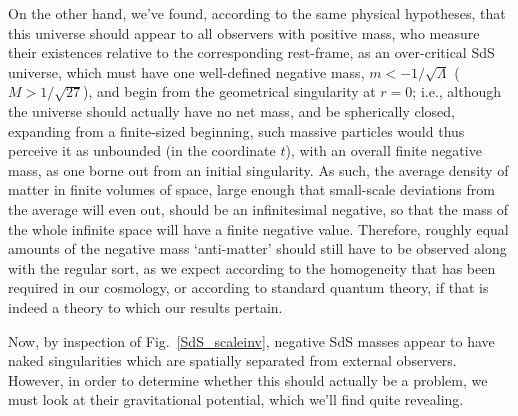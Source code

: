 On the other hand, we've found, according to the same physical hypotheses, that this universe should appear to all observers with positive mass, who measure their existences relative to the corresponding rest-frame, as an over-critical SdS universe, which must have one well-defined negative mass, $m<-1/\sqrt{\Lambda}$ ($M>1/\sqrt{27}$), and begin from the geometrical singularity at $r=0$; i.e., although the universe should actually have no net mass, and be spherically closed, expanding from a finite-sized beginning, such massive particles would thus perceive it as unbounded (in the coordinate $t$), with an overall finite negative mass, as one borne out from an initial singularity. As such, the average density of matter in finite volumes of space, large enough that small-scale deviations from the average will even out, should be an infinitesimal negative, so that the mass of the whole infinite space will have a finite negative value. Therefore, roughly equal amounts of the negative mass `anti-matter' should still have to be observed along with the regular sort, as we expect according to the homogeneity that has been required in our cosmology, or according to standard quantum theory, if that is indeed a theory to which our results pertain. 

Now, by inspection of Fig.~\ref{SdS_scaleinv}, negative SdS masses appear to have naked singularities which are spatially separated from external observers. However, in order to determine whether this should actually be a problem, we must look at their gravitational potential, which we'll find quite revealing.

